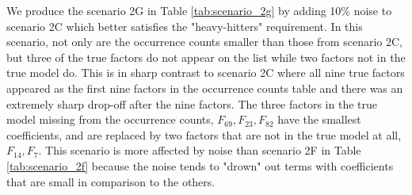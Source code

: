 We produce the scenario 2G in Table \ref{tab:scenario_2g} by adding 10\% noise to scenario 2C which better satisfies the "heavy-hitters" requirement.
In this scenario, not only are the occurrence counts smaller than those from scenario 2C, but three of the true factors do not appear on the list while two factors not in the true model do.
This is in sharp contrast to scenario 2C where all nine true factors appeared as the first nine factors in the occurrence counts table and there was an extremely sharp drop-off after the nine factors.
The three factors in the true model missing from the occurrence counts, $F_{69}, F_{23}, F_{82}$ have the smallest coefficients, and are replaced by two factors that are not in the true model at all, $F_{14}, F_{7}$.
This scenario is more affected by noise than scenario 2F in Table \ref{tab:scenario_2f} because the noise tends to "drown" out terms with coefficients that are small in comparison to the others.

